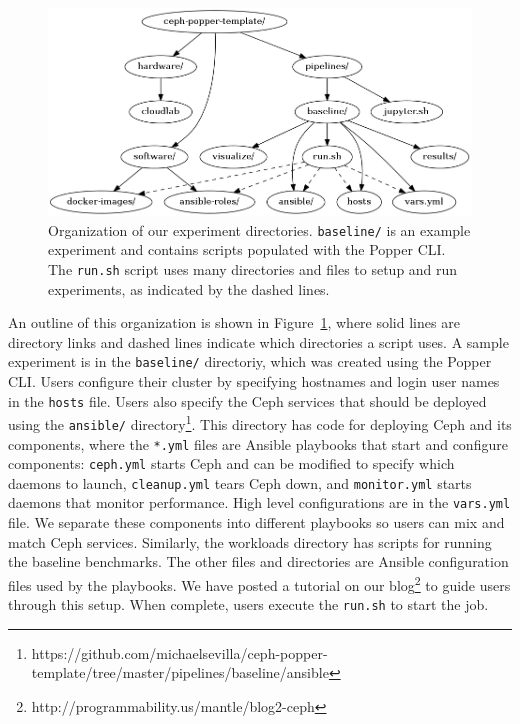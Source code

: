 \begin{figure}[tb] 
  \centering
  \includegraphics[width=1\linewidth]{./figures/expdir.png}
  \caption{Organization of our experiment directories. \texttt{baseline/} is an
example experiment and contains scripts populated with the Popper CLI. The
\texttt{run.sh} script uses many directories and files to setup and run
experiments, as indicated by the dashed lines.}
  \label{fig:expdir}
\end{figure}

An outline of this organization is shown in Figure~\ref{fig:expdir}, where
solid lines are directory links and dashed lines indicate which directories a
script uses.  A sample experiment is in the \texttt{baseline/} directoriy,
which was created using the Popper CLI. Users configure their cluster by
specifying hostnames and login user names in the \texttt{hosts} file.  Users
also specify the Ceph services that should be deployed using the
\texttt{ansible/}
directory\footnote{https://github.com/michaelsevilla/ceph-popper-template/tree/master/pipelines/baseline/ansible}.
This directory has code for deploying Ceph and its components, where the
\texttt{*.yml} files are Ansible playbooks that start and configure components:
\texttt{ceph.yml} starts Ceph and can be modified to specify which daemons to
launch, \texttt{cleanup.yml} tears Ceph down, and \texttt{monitor.yml} starts
daemons that monitor performance.  High level configurations are in the
\texttt{vars.yml} file.  We separate these components into different playbooks
so users can mix and match Ceph services.  Similarly, the workloads directory
has scripts for running the baseline benchmarks. The other files and
directories are Ansible configuration files used by the playbooks. We have
posted a tutorial on our
blog\footnote{http://programmability.us/mantle/blog2-ceph} to guide users
through this setup. When complete, users execute the \texttt{run.sh} to start
the job.


